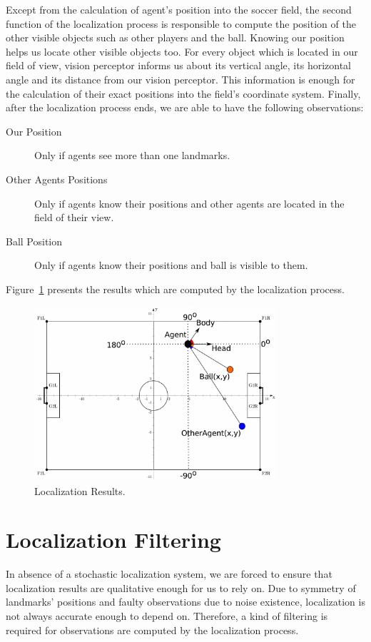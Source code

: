 Except from the calculation of agent's position into the soccer field, the second function of the localization process is responsible to compute the position of the other visible objects such as other players and the ball. 
Knowing our position helps us locate other visible objects too. For every object which is located in our field of view, vision perceptor informs us about its vertical angle, its horizontal angle and its distance from our vision perceptor. This information is enough for the calculation of their exact positions into the field's coordinate system. Finally, after the localization process ends, we are able to have the following observations:

\begin{description}
	\item[Our Position] Only if agents see more than one landmarks.
	\item[Other Agents Positions] Only if agents know their positions and other agents are located in the field of their view.
	\item[Ball Position] Only if agents know their positions and ball is visible to them.
\end{description}
Figure~\ref{fig:LocalizationResults} presents the results which are computed by the localization process.

\begin{figure}[t!]
\centering
  \includegraphics[width=0.8\textwidth]{Chapter3/figures/LocalizationResults.pdf}
  \caption{Localization Results.} 
  \label{fig:LocalizationResults}
\end{figure}
\hfill





\section{Localization Filtering}
In absence of a stochastic localization system, we are forced to ensure that localization results are qualitative enough for us to rely on. Due to symmetry of landmarks' positions and faulty observations due to noise existence, localization is not always accurate enough to depend on. Therefore, a kind of filtering is required for observations are computed by the localization process.

